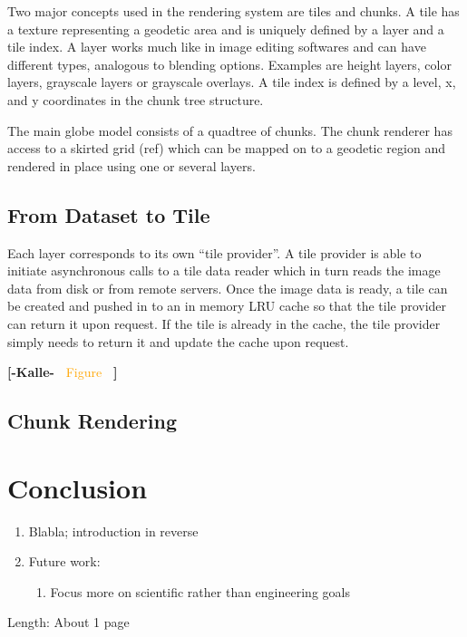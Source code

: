 \documentclass[journal]{vgtc}                %
\newcommand{\kallecomment}[1]{\textbf{[-Kalle-~}
    \textcolor{orange}{#1}
    \textbf{~]}}
\begin{document}
Two major concepts used in the rendering system are tiles and chunks. A tile has a texture representing a geodetic area and is uniquely defined by a layer and a tile index.
A layer works much like in image editing softwares and can have different types, analogous to blending options.
Examples are height layers, color layers, grayscale layers or grayscale overlays.
A tile index is defined by a level, x, and y coordinates in the chunk tree structure.

The main globe model consists of a quadtree of chunks.
The chunk renderer has access to a skirted grid (ref) which can be mapped on to a geodetic region and rendered in place using one or several layers.

\subsection{From Dataset to Tile}

Each layer corresponds to its own ``tile provider''.
A tile provider is able to initiate asynchronous calls to a tile data reader which in turn reads the image data from disk or from remote servers.
Once the image data is ready, a tile can be created and pushed in to an in memory LRU cache so that the tile provider can return it upon request.
If the tile is already in the cache, the tile provider simply needs to return it and update the cache upon request.

\kallecomment{Figure}

\subsection{Chunk Rendering}




\section{Conclusion} \label{sec:system}
\begin{enumerate}
  \item Blabla; introduction in reverse
  \item Future work:
  \begin{enumerate}
    \item Focus more on scientific rather than engineering goals
  \end{enumerate}
\end{enumerate}
Length: About 1 page

\end{document}
